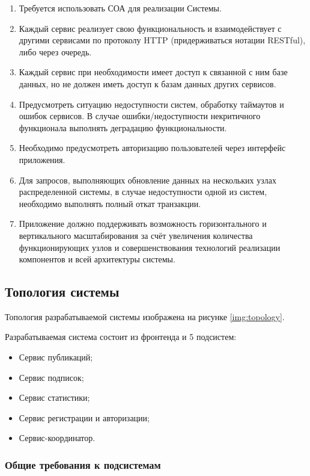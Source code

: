 \documentclass{bmstu-gost-7-32}
\begin{document}
\begin{enumerate}
	\item Требуется использовать СОА для реализации Системы.
	\item Каждый сервис реализует свою функциональность и взаимодействует с другими сервисами по протоколу HTTP (придерживаться нотации RESTful), либо через очередь.
	\item Каждый сервис при необходимости имеет доступ к связанной с ним базе данных, но не должен иметь доступ к базам данных других сервисов.
	\item Предусмотреть ситуацию недоступности систем, обработку таймаутов и ошибок сервисов.
	В случае ошибки/недоступности некритичного функционала выполнять деградацию функциональности.
	\item Необходимо предусмотреть авторизацию пользователей через
	интерфейс приложения.
	\item  Для запросов, выполняющих обновление данных на нескольких узлах распределенной системы, в случае недоступности одной из систем, необходимо выполнять полный откат транзакции.
	\item Приложение должно поддерживать возможность горизонтального и вертикального масштабирования за счёт увеличения количества функционирующих узлов и совершенствования технологий реализации компонентов и всей архитектуры системы.
\end{enumerate}

\subsection{Топология системы}

Топология разрабатываемой системы изображена на рисунке \ref{img:topology}.


Разрабатываемая система состоит из фронтенда и 5 подсистем:
\begin{itemize}
	\item Сервис публикаций;
	\item Сервис подписок;
	\item Сервис статистики;
	\item Сервис регистрации и авторизации;
	\item Сервис-координатор.
\end{itemize}

\subsubsection{Общие требования к подсистемам}
\end{document}
